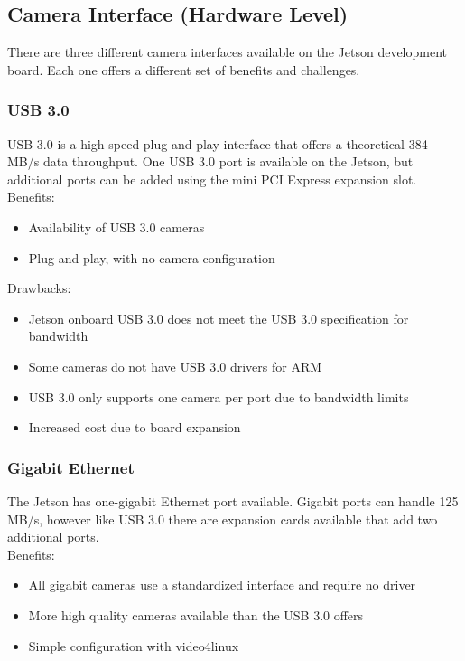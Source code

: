 \subsection{Camera Interface (Hardware Level)}
There are three different camera interfaces available on the Jetson development board. Each one offers a different set of benefits and challenges.\\
	\subsubsection{USB 3.0}
	USB 3.0 is a high-speed plug and play interface that offers a theoretical 384 MB/s data throughput. One USB 3.0 port is available on the Jetson, but 		additional ports can be added using the mini PCI Express expansion slot.\\

	Benefits:
	\begin{itemize}[leftmargin=2cm,labelindent=2cm]
		\item Availability of USB 3.0 cameras
		\item Plug and play, with no camera configuration
	\end{itemize}
	
	Drawbacks:
	\begin{itemize}[leftmargin=2cm,labelindent=2cm]
		\item Jetson onboard USB 3.0 does not meet the USB 3.0 specification for bandwidth
		\item Some cameras do not have USB 3.0 drivers for ARM
		\item USB 3.0 only supports one camera per port due to bandwidth limits
		\item Increased cost due to board expansion\\
	\end{itemize}
	
	\subsubsection{Gigabit Ethernet}
	The Jetson has one-gigabit Ethernet port available. Gigabit ports can handle 125 MB/s, however like USB 3.0 there are expansion cards available that add two additional ports.\\
	
	Benefits:
	\begin{itemize}[leftmargin=2cm,labelindent=2cm]
		\item All gigabit cameras use a standardized interface and require no driver
		\item More high quality cameras available than the USB 3.0 offers
		\item Simple configuration with video4linux
	\end{itemize}
	
